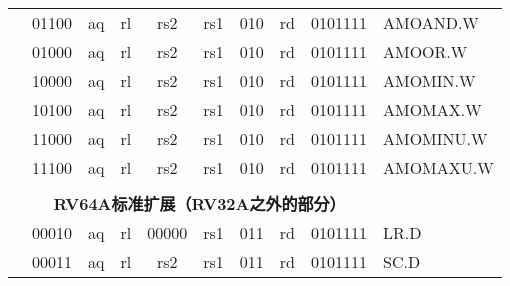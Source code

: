 \begin{table}[p]
\begin{small}
\begin{center}
\begin{tabular}{p{0in}p{0.4in}p{0.05in}p{0.05in}p{0.05in}p{0.05in}p{0.4in}p{0.6in}p{0.4in}p{0.6in}p{0.7in}l}
&
\multicolumn{2}{|c|}{01100} &
\multicolumn{1}{c|}{aq} &
\multicolumn{1}{c|}{rl} &
\multicolumn{2}{c|}{rs2} &
\multicolumn{1}{c|}{rs1} &
\multicolumn{1}{c|}{010} &
\multicolumn{1}{c|}{rd} &
\multicolumn{1}{c|}{0101111} & AMOAND.W \\
\cline{2-11}


&
\multicolumn{2}{|c|}{01000} &
\multicolumn{1}{c|}{aq} &
\multicolumn{1}{c|}{rl} &
\multicolumn{2}{c|}{rs2} &
\multicolumn{1}{c|}{rs1} &
\multicolumn{1}{c|}{010} &
\multicolumn{1}{c|}{rd} &
\multicolumn{1}{c|}{0101111} & AMOOR.W \\
\cline{2-11}


&
\multicolumn{2}{|c|}{10000} &
\multicolumn{1}{c|}{aq} &
\multicolumn{1}{c|}{rl} &
\multicolumn{2}{c|}{rs2} &
\multicolumn{1}{c|}{rs1} &
\multicolumn{1}{c|}{010} &
\multicolumn{1}{c|}{rd} &
\multicolumn{1}{c|}{0101111} & AMOMIN.W \\
\cline{2-11}


&
\multicolumn{2}{|c|}{10100} &
\multicolumn{1}{c|}{aq} &
\multicolumn{1}{c|}{rl} &
\multicolumn{2}{c|}{rs2} &
\multicolumn{1}{c|}{rs1} &
\multicolumn{1}{c|}{010} &
\multicolumn{1}{c|}{rd} &
\multicolumn{1}{c|}{0101111} & AMOMAX.W \\
\cline{2-11}


&
\multicolumn{2}{|c|}{11000} &
\multicolumn{1}{c|}{aq} &
\multicolumn{1}{c|}{rl} &
\multicolumn{2}{c|}{rs2} &
\multicolumn{1}{c|}{rs1} &
\multicolumn{1}{c|}{010} &
\multicolumn{1}{c|}{rd} &
\multicolumn{1}{c|}{0101111} & AMOMINU.W \\
\cline{2-11}


&
\multicolumn{2}{|c|}{11100} &
\multicolumn{1}{c|}{aq} &
\multicolumn{1}{c|}{rl} &
\multicolumn{2}{c|}{rs2} &
\multicolumn{1}{c|}{rs1} &
\multicolumn{1}{c|}{010} &
\multicolumn{1}{c|}{rd} &
\multicolumn{1}{c|}{0101111} & AMOMAXU.W \\
\cline{2-11}


&
\multicolumn{10}{c}{} & \\
&
\multicolumn{10}{c}{\bf RV64A标准扩展（RV32A之外的部分）} & \\
\cline{2-11}


&
\multicolumn{2}{|c|}{00010} &
\multicolumn{1}{c|}{aq} &
\multicolumn{1}{c|}{rl} &
\multicolumn{2}{c|}{00000} &
\multicolumn{1}{c|}{rs1} &
\multicolumn{1}{c|}{011} &
\multicolumn{1}{c|}{rd} &
\multicolumn{1}{c|}{0101111} & LR.D \\
\cline{2-11}


&
\multicolumn{2}{|c|}{00011} &
\multicolumn{1}{c|}{aq} &
\multicolumn{1}{c|}{rl} &
\multicolumn{2}{c|}{rs2} &
\multicolumn{1}{c|}{rs1} &
\multicolumn{1}{c|}{011} &
\multicolumn{1}{c|}{rd} &
\multicolumn{1}{c|}{0101111} & SC.D \\
\cline{2-11}



\end{tabular}
\end{center}
\end{small}
\end{table}
